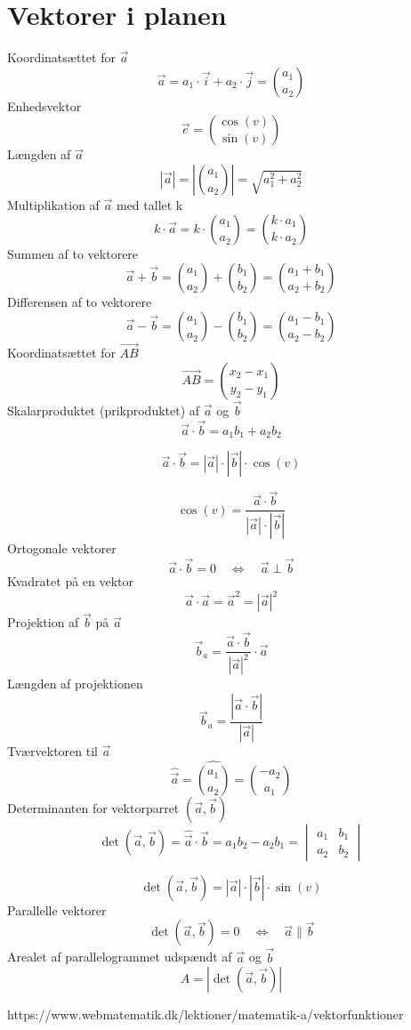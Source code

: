 \section{Vektorer i planen}
Koordinatsættet for $\vec{a}$
\[\vec{a}=a_1 \cdot \vec{i}+a_2 \cdot \vec{j}=\binom{a_1}{a_2} \]
Enhedsvektor
\[\vec{e}=\binom{\cos(v)}{\sin(v)}\]
Længden af $\vec{a}$
\[|\vec{a}|=\left|\binom{a_1}{a_2}\right|=\sqrt{a_1^2+a_2^2}\]
Multiplikation af $\vec{a}$ med tallet k
\[k\cdot\vec{a}=k\cdot\binom{a_1}{a_2}=\binom{k\cdot a_1}{k\cdot a_2}\]
Summen af to vektorere
\[\vec{a}+\vec{b}=\binom{a_1}{a_2}+\binom{b_1}{b_2}=\binom{a_1+b_1}{a_2+b_2}\]
Differensen af to vektorere
\[\vec{a}-\vec{b}=\binom{a_1}{a_2}-\binom{b_1}{b_2}=\binom{a_1-b_1}{a_2-b_2}\]
Koordinatsættet for $\overrightarrow{AB}$
\[\overrightarrow{AB}=\binom{x_2-x_1}{y_2-y_1}\]
Skalarproduktet (prikproduktet) af $\vec{a}$ og $\vec{b}$
\[\vec{a}\cdot\vec{b}=a_1b_1+a_2b_2\]

\[\vec{a}\cdot\vec{b}=|\vec{a}|\cdot|\vec{b}|\cdot\cos(v)\]

\[\cos(v)=\frac{\vec{a}\cdot\vec{b}}{|\vec{a}|\cdot|\vec{b}|}\]
Ortogonale vektorer
\[\vec{a}\cdot\vec{b}=0\quad\Leftrightarrow \quad \vec{a}\perp \vec{b}\]
Kvadratet på en vektor
\[\vec{a}\cdot\vec{a}=\vec{a}^2=|\vec{a}|^2\]
Projektion af $\vec{b}$ på $\vec{a}$
\[\vec{b}_a=\frac{\vec{a}\cdot\vec{b}}{|\vec{a}|^2}\cdot\vec{a}\]
Længden af projektionen
\[\vec{b}_a=\frac{|\vec{a}\cdot\vec{b}|}{|\vec{a}|}\]
Tværvektoren til $\vec{a}$
\[\hat{\vec{a}}=\widehat{\binom{a_1}{a_2}}=\binom{-a_2}{a_1}\]
Determinanten for vektorparret $(\vec{a},\vec{b})$
\[\det(\vec{a},\vec{b})=\hat{\vec{a}}\cdot\vec{b}=a_1b_2-a_2b_1=\begin{vmatrix}
    a_1&b_1  \\
    a_2& b_2
   \end{vmatrix}\]

\[\det(\vec{a},\vec{b})=|\vec{a}|\cdot|\vec{b}|\cdot\sin(v)\]
Parallelle vektorer
\[\det(\vec{a},\vec{b})=0 \quad\Leftrightarrow\quad \vec{a}\| \vec{b} \]
Arealet af parallelogrammet udspændt af $\vec{a}$ og $\vec{b}$
\[A=|\det(\vec{a},\vec{b})|\]



https://www.webmatematik.dk/lektioner/matematik-a/vektorfunktioner